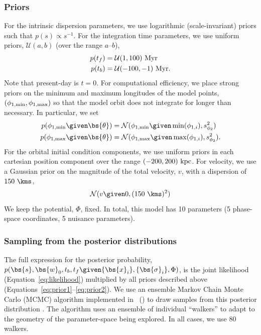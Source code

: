 \documentclass[letterpaper,12pt,preprint]{aastex}
\newcommand{\norm}{\mathcal{N}}
\begin{document}
\subsubsection{Priors}

For the intrinsic dispersion parameters, we use logarithmic (scale-invariant) priors such that $p(s) \propto s^{-1}$. For the integration time parameters, we use uniform priors, $\mathcal{U}(a,b)$ (over the range $a$--$b$),
\begin{align}
	p(t_f) &= \mathcal{U}(1,100)~{\rm Myr}\label{eq:prior1}\\
	p(t_b) &= \mathcal{U}(-100,-1)~{\rm Myr}.
\end{align}
Note that present-day is $t=0$. For computational efficiency, we place strong priors on the minimum and maximum longitudes of the model points, $(\phi_{1,{\rm min}},\phi_{1,{\rm max}})$ so that the model orbit does not integrate for longer than necessary. In particular, we set
\begin{align}
	p(\phi_{1,{\rm min}} \given \bs{\theta}) &= \norm(\phi_{1,{\rm min}} \given \min(\phi_{1,i}), s^2_{\phi_2})\\
	p(\phi_{1,{\rm max}} \given \bs{\theta}) &= \norm(\phi_{1,{\rm max}} \given \max(\phi_{1,i}), s^2_{\phi_2}).
\end{align}
For the orbital initial condition components, we use uniform priors in each cartesian position component over the range $(-200,200)~{\rm kpc}$. For velocity, we use a Gaussian prior on the magnitude of the total velocity, $v$, with a dispersion of $150~\kms$,
\begin{equation}
	\norm(v \given 0, (150~\kms)^2) \label{eq:prior2}
\end{equation}
We keep the potential, $\Phi$, fixed. In total, this model has 10 parameters (5 phase-space coordinates, 5 nuisance parameters).

\subsubsection{Sampling from the posterior distributions}

The full expression for the posterior probability, $p(\bs{s}, \bs{w}_0, t_b, t_f \given \{\bs{x}_i\}, \{\bs{\sigma}_i\}, \Phi)$, is the joint likelihood (Equation~\ref{eq:likelihood}) multiplied by all priors described above (Equations~\ref{eq:prior1}--\ref{eq:prior2}). We use an ensemble Markov Chain Monte Carlo (MCMC) algorithm \citep{goodman10} implemented in \python\ () to draw samples from this posterior distribution \citep{foremanmackey13}. The algorithm uses an ensemble of individual ``walkers'' to adapt to the geometry of the parameter-space being explored. In all cases, we use 80 walkers.
\end{document}

